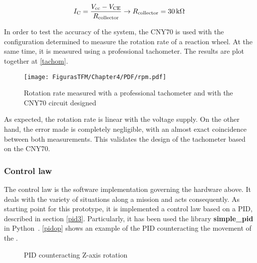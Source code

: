 \begin{align} \label{eqtrans}
\centering
I_{\text{C}}=\frac{V_{\text{cc}}-V_{\text{CE}}}{R_{\text{collector}}} \rightarrow R_{\text{collector}} = \SI{30}{k\ohm}
\end{align} %

In order to test the accuracy of the system, the CNY70 is used with the configuration determined to measure the rotation rate of a reaction wheel. At the same time, it is measured using a professional tachometer. The results are plot together at \autoref{tachom}.

		\begin{figure} [H]
			\centering
			\texttt{[image: FigurasTFM/Chapter4/PDF/rpm.pdf]}
			\caption{Rotation rate measured with a professional tachometer and with the CNY70 circuit designed} 	\label{tachom}
			\vspace{-2cm}
\end{figure}

As expected, the rotation rate is linear with the voltage supply. On the other hand, the error made is completely negligible, with an almost exact coincidence between both measurements. This validates the design of the tachometer based on the CNY70.


\subsubsection{Control law}

The control law is the software implementation governing the hardware above. It deals with the variety of situations along a mission and acts consequently. As starting point for this prototype, it is implemented a control law based on a \acrshort{PID}, described in section \ref{pid3}. Particularly, it has been used the library \textbf{simple\_pid} in Python~\cite{simplepid}. \autoref{pidop} shows an example of the \acrshort{PID} counteracting the movement of the  .

\begin{figure}[H]
			\centering
			\quad
			\caption{\acrshort{PID} counteracting Z-axis rotation} \label{pidop}
			\vspace{-2cm}
\end{figure}


